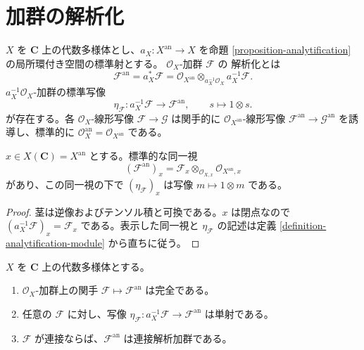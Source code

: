 \section{加群の解析化}
\label{section-analytification-modules}

\begin{definition}
\label{definition-analytification-module}
\begin{reference}
\cite[\S 3、第9項、定義2]{GAGA}
\end{reference}
$X$ を $\mathbf C$ 上の代数多様体とし、$a_X:X^{\mathrm{an}}\to X$ を命題
\ref{proposition-analytification} の局所環付き空間の標準射とする。
$\mathcal O_X$-加群 $\mathcal F$ の {解析化}とは
$$
\mathcal F^{\mathrm{an}}=a_X^*\mathcal F
=\mathcal O_{X^{\mathrm{an}}}
\otimes_{a_X^{-1}\mathcal O_X}a_X^{-1}\mathcal F.
$$
$a_X^{-1}\mathcal O_X$-加群の標準写像
$$
\eta_{\mathcal F}:a_X^{-1}\mathcal F\longrightarrow
\mathcal F^{\mathrm{an}},\qquad s\longmapsto1\otimes s.
$$
が存在する。各 $\mathcal O_X$-線形写像 $\mathcal F\to\mathcal G$ は関手的に
$\mathcal O_{X^{\mathrm{an}}}$-線形写像
$\mathcal F^{\mathrm{an}}\to\mathcal G^{\mathrm{an}}$ を誘導し、標準的に
$\mathcal O_X^{\mathrm{an}}=\mathcal O_{X^{\mathrm{an}}}$ である。
\end{definition}

\begin{lemma}
\label{lemma-analytification-module-stalks}
$x\in X(\mathbf C)=X^{\mathrm{an}}$ とする。標準的な同一視
$$
(\mathcal F^{\mathrm{an}})_x
=\mathcal F_x\otimes_{\mathcal O_{X,x}}
\mathcal O_{X^{\mathrm{an}},x}
$$
があり、この同一視の下で $(\eta_{\mathcal F})_x$ は写像 $m\mapsto1\otimes m$ である。
\end{lemma}

\begin{proof}
茎は逆像およびテンソル積と可換である。$x$ は閉点なので
$(a_X^{-1}\mathcal F)_x=\mathcal F_x$ である。表示した同一視と
$\eta_{\mathcal F}$ の記述は定義 \ref{definition-analytification-module} から直ちに従う。
\end{proof}

\begin{lemma}
\label{lemma-analytification-exact-faithful-coherent}
\begin{reference}
\cite[\S 3、第9項、命題10]{GAGA}
\end{reference}
$X$ を $\mathbf C$ 上の代数多様体とする。
\begin{enumerate}
\item $\mathcal O_X$-加群上の関手 $\mathcal F\mapsto\mathcal F^{\mathrm{an}}$ は完全である。
\item 任意の $\mathcal F$ に対し、写像 $\eta_{\mathcal F}:a_X^{-1}\mathcal F\to
\mathcal F^{\mathrm{an}}$ は単射である。
\item $\mathcal F$ が連接ならば、$\mathcal F^{\mathrm{an}}$ は連接解析加群である。
\end{enumerate}
\end{lemma}

